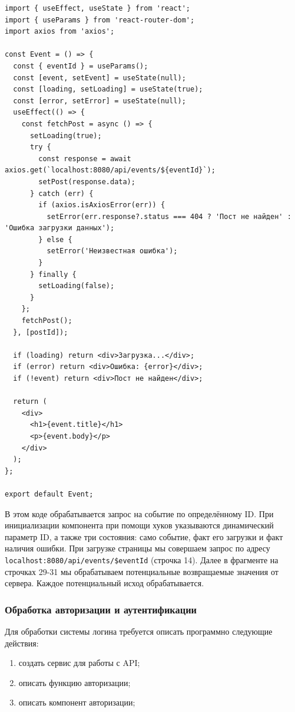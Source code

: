 \documentclass[diploma]{SCWorks}
\begin{document}
\begin{verbatim}
import { useEffect, useState } from 'react';
import { useParams } from 'react-router-dom';
import axios from 'axios';

const Event = () => {
  const { eventId } = useParams();
  const [event, setEvent] = useState(null);
  const [loading, setLoading] = useState(true);
  const [error, setError] = useState(null);
  useEffect(() => {
    const fetchPost = async () => {
      setLoading(true);
      try {
        const response = await axios.get(`localhost:8080/api/events/${eventId}`);
        setPost(response.data);
      } catch (err) {
        if (axios.isAxiosError(err)) {
          setError(err.response?.status === 404 ? 'Пост не найден' : 'Ошибка загрузки данных');
        } else {
          setError('Неизвестная ошибка');
        }
      } finally {
        setLoading(false);
      }
    };
    fetchPost();
  }, [postId]);

  if (loading) return <div>Загрузка...</div>;
  if (error) return <div>Ошибка: {error}</div>;
  if (!event) return <div>Пост не найден</div>;

  return (
    <div>
      <h1>{event.title}</h1>
      <p>{event.body}</p>
    </div>
  );
};

export default Event;
\end{verbatim}

В этом коде обрабатывается запрос на событие по определённому ID. При 
инициализации компонента при помощи хуков указываются динамический параметр ID, 
а также три состояния: само событие, факт его загрузки и факт наличия ошибки.
При загрузке страницы мы совершаем запрос по адресу 
\texttt{localhost:8080/api/events/\${eventId}} (строчка 14). Далее в фрагменте
на строчках 29-31 мы обрабатываем потенциальные возвращаемые значения от 
сервера. Каждое потенциальный исход обрабатывается.

\subsubsection{Обработка авторизации и аутентификации}

Для обработки системы логина требуется описать программно следующие действия:
\begin{enumerate}
    \item создать сервис для работы с API; %
    \item описать функцию авторизации; %
    \item описать компонент авторизации; %
\end{enumerate}
\end{document}
